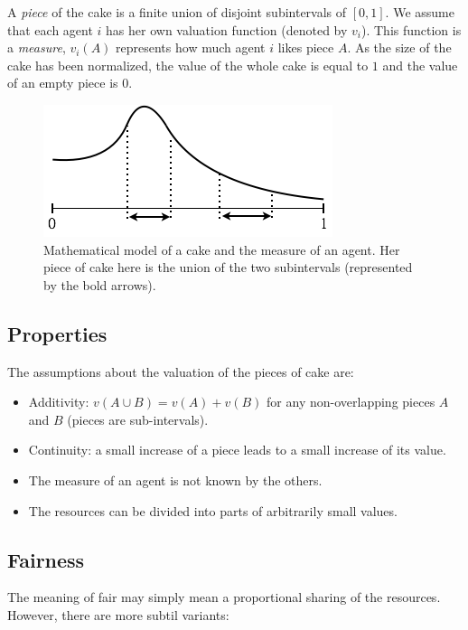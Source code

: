 A \textit{piece} of the cake is a finite union of disjoint subintervals of $[0,1]$.
We assume that each agent $i$ has her own valuation function (denoted by $v_i$).
This function is a \textit{measure}, $v_i(A)$ represents how much agent $i$ likes piece $A$. 
As the size of the cake has been normalized, the value of the whole cake is equal to $1$
and the value of an empty piece is $0$.
\begin{figure}[htb]
\begin{center}
        \includegraphics[scale=0.5]{FiguresMaths/cakeMeasure}
        \caption{Mathematical model of a cake and the measure of an agent. 
        Her piece of cake here is the union of the two subintervals 
        (represented by the bold arrows).}
        \label{Fig:cakeMeasure}
\end{center}
\end{figure}

\subsection{Properties}

The assumptions about the valuation of the pieces of cake are:
\begin{itemize}
\item Additivity: $v(A \cup B) = v(A) + v(B)$ for any non-overlapping pieces $A$ and $B$
(pieces are sub-intervals). 
\item 
Continuity: a small increase of a piece leads to a small increase of its value. 
\item The measure of an agent is not known by the others.
\item The resources can be divided into parts of arbitrarily small values.
\end{itemize}

\subsection{Fairness}

The meaning of fair may simply mean a proportional sharing of the resources. 
However, there are more subtil variants:

